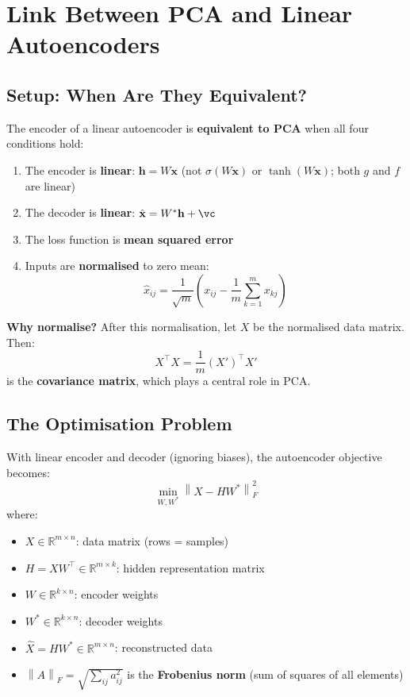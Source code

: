 \documentclass[12pt,a4paper]{article}
\newcommand{\R}{\mathbb{R}}
\newcommand{\norm}[1]{\left\|#1\right\|}
\newcommand{\vx}{\mathbf{x}}
\newcommand{\vh}{\mathbf{h}}
\newcommand{\hatx}{\hat{\mathbf{x}}}
\begin{document}
\section{Link Between PCA and Linear Autoencoders}

\subsection{Setup: When Are They Equivalent?}

\begin{thmbox}
The encoder of a linear autoencoder is \textbf{equivalent to PCA} when all four conditions hold:
\begin{enumerate}
  \item The encoder is \textbf{linear}: $\vh = W\vx$ (not $\sigma(W\vx)$ or $\tanh(W\vx)$; both $g$ and $f$ are linear)
  \item The decoder is \textbf{linear}: $\hatx = W^*\vh + \vc$
  \item The loss function is \textbf{mean squared error}
  \item Inputs are \textbf{normalised} to zero mean:
  \[
  \hat{x}_{ij} = \frac{1}{\sqrt{m}}\left(x_{ij} - \frac{1}{m}\sum_{k=1}^{m}x_{kj}\right)
  \]
\end{enumerate}
\end{thmbox}

\textbf{Why normalise?} After this normalisation, let $X$ be the normalised data matrix. Then:
\[
X^\top X = \frac{1}{m}(X')^\top X'
\]
is the \textbf{covariance matrix}, which plays a central role in PCA.

\subsection{The Optimisation Problem}

With linear encoder and decoder (ignoring biases), the autoencoder objective becomes:
\[
\min_{W,W^*} \norm{X - HW^*}_F^2
\]
where:
\begin{itemize}
  \item $X \in \R^{m\times n}$: data matrix (rows = samples)
  \item $H = XW^\top \in \R^{m\times k}$: hidden representation matrix
  \item $W \in \R^{k\times n}$: encoder weights
  \item $W^* \in \R^{k\times n}$: decoder weights
  \item $\hat{X} = HW^* \in \R^{m\times n}$: reconstructed data
  \item $\norm{A}_F = \sqrt{\sum_{ij}a_{ij}^2}$ is the \textbf{Frobenius norm} (sum of squares of all elements)
\end{itemize}
\end{document}
